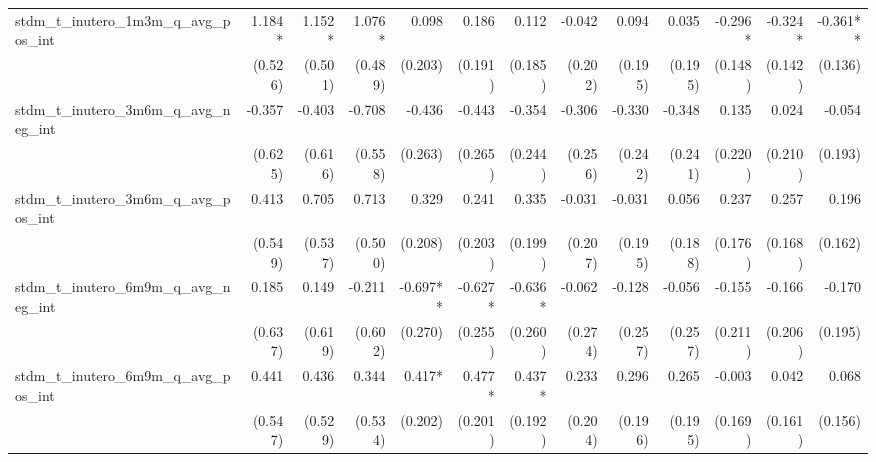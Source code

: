 \begin{tabular}{lrrrrrrrrrrrr}
stdm\_t\_inutero\_1m3m\_q\_avg\_pos\_int    &       1.184* &       1.152* &       1.076* &        0.098 &        0.186 &        0.112 &       -0.042 &        0.094 &        0.035 &      -0.296* &      -0.324* &     -0.361** \\ 
                                            &      (0.526) &      (0.501) &      (0.489) &      (0.203) &      (0.191) &      (0.185) &      (0.202) &      (0.195) &      (0.195) &      (0.148) &      (0.142) &      (0.136) \\ 
stdm\_t\_inutero\_3m6m\_q\_avg\_neg\_int    &       -0.357 &       -0.403 &       -0.708 &       -0.436 &       -0.443 &       -0.354 &       -0.306 &       -0.330 &       -0.348 &        0.135 &        0.024 &       -0.054 \\ 
                                            &      (0.625) &      (0.616) &      (0.558) &      (0.263) &      (0.265) &      (0.244) &      (0.256) &      (0.242) &      (0.241) &      (0.220) &      (0.210) &      (0.193) \\ 
stdm\_t\_inutero\_3m6m\_q\_avg\_pos\_int    &        0.413 &        0.705 &        0.713 &        0.329 &        0.241 &        0.335 &       -0.031 &       -0.031 &        0.056 &        0.237 &        0.257 &        0.196 \\ 
                                            &      (0.549) &      (0.537) &      (0.500) &      (0.208) &      (0.203) &      (0.199) &      (0.207) &      (0.195) &      (0.188) &      (0.176) &      (0.168) &      (0.162) \\ 
stdm\_t\_inutero\_6m9m\_q\_avg\_neg\_int    &        0.185 &        0.149 &       -0.211 &     -0.697** &      -0.627* &      -0.636* &       -0.062 &       -0.128 &       -0.056 &       -0.155 &       -0.166 &       -0.170 \\ 
                                            &      (0.637) &      (0.619) &      (0.602) &      (0.270) &      (0.255) &      (0.260) &      (0.274) &      (0.257) &      (0.257) &      (0.211) &      (0.206) &      (0.195) \\ 
stdm\_t\_inutero\_6m9m\_q\_avg\_pos\_int    &        0.441 &        0.436 &        0.344 &       0.417* &       0.477* &       0.437* &        0.233 &        0.296 &        0.265 &       -0.003 &        0.042 &        0.068 \\ 
                                            &      (0.547) &      (0.529) &      (0.534) &      (0.202) &      (0.201) &      (0.192) &      (0.204) &      (0.196) &      (0.195) &      (0.169) &      (0.161) &      (0.156) \\ 

\end{tabular}
